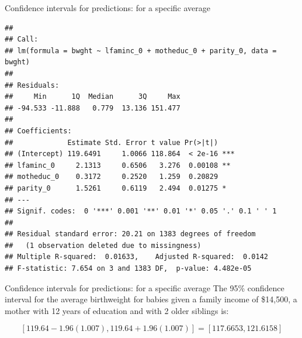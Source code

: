 \documentclass[
  ignorenonframetext,
]{beamer}
\newenvironment{Shaded}{\begin{snugshade}}{\end{snugshade}}
\newcommand{\CommentTok}[1]{\textcolor[rgb]{0.56,0.35,0.01}{\textit{#1}}}
\newcommand{\DecValTok}[1]{\textcolor[rgb]{0.00,0.00,0.81}{#1}}
\newcommand{\FloatTok}[1]{\textcolor[rgb]{0.00,0.00,0.81}{#1}}
\newcommand{\FunctionTok}[1]{\textcolor[rgb]{0.00,0.00,0.00}{#1}}
\newcommand{\NormalTok}[1]{#1}
\newcommand{\OtherTok}[1]{\textcolor[rgb]{0.56,0.35,0.01}{#1}}
\newcommand{\SpecialCharTok}[1]{\textcolor[rgb]{0.00,0.00,0.00}{#1}}
\begin{document}
\begin{frame}[fragile]{Confidence intervals for predictions: for a
specific average}
\protect\hypertarget{confidence-intervals-for-predictions-for-a-specific-average-6}{}
\tiny

\begin{Shaded}
\end{Shaded}

\begin{verbatim}
## 
## Call:
## lm(formula = bwght ~ lfaminc_0 + motheduc_0 + parity_0, data = bwght)
## 
## Residuals:
##     Min      1Q  Median      3Q     Max 
## -94.533 -11.888   0.779  13.136 151.477 
## 
## Coefficients:
##             Estimate Std. Error t value Pr(>|t|)    
## (Intercept) 119.6491     1.0066 118.864  < 2e-16 ***
## lfaminc_0     2.1313     0.6506   3.276  0.00108 ** 
## motheduc_0    0.3172     0.2520   1.259  0.20829    
## parity_0      1.5261     0.6119   2.494  0.01275 *  
## ---
## Signif. codes:  0 '***' 0.001 '**' 0.01 '*' 0.05 '.' 0.1 ' ' 1
## 
## Residual standard error: 20.21 on 1383 degrees of freedom
##   (1 observation deleted due to missingness)
## Multiple R-squared:  0.01633,    Adjusted R-squared:  0.0142 
## F-statistic: 7.654 on 3 and 1383 DF,  p-value: 4.482e-05
\end{verbatim}
\end{frame}

\begin{frame}{Confidence intervals for predictions: for a specific
average}
\protect\hypertarget{confidence-intervals-for-predictions-for-a-specific-average-7}{}
The 95\% confidence interval for the average birthweight for babies
given a family income of \$14,500, a mother with 12 years of education
and with 2 older siblings is:

\[
[119.64-1.96(1.007), 119.64+1.96(1.007)]=[117.6653,121.6158]
\]
\end{frame}
\end{document}
